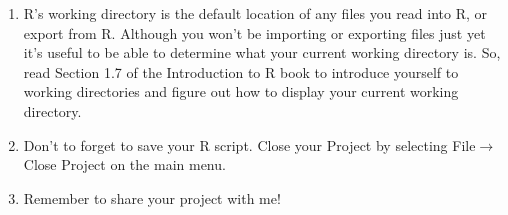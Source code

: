 \documentclass[12pt]{article}
\newcommand{\arrow}{\ensuremath{\rightarrow}}
\begin{document}
\begin{enumerate}
 

\item R’s working directory is the default location of any files you read into R, or export from R. Although you won’t be importing or exporting files just yet  it’s useful to be able to determine what your current working directory is. So, read Section 1.7 of the Introduction to R book to introduce yourself to working directories and figure out how to display your current working directory.

 

\item Don’t to forget to save your R script. Close your Project by selecting File\arrow Close Project on the main menu.

\item Remember to share your project with me!

\end{enumerate}
\end{document}
